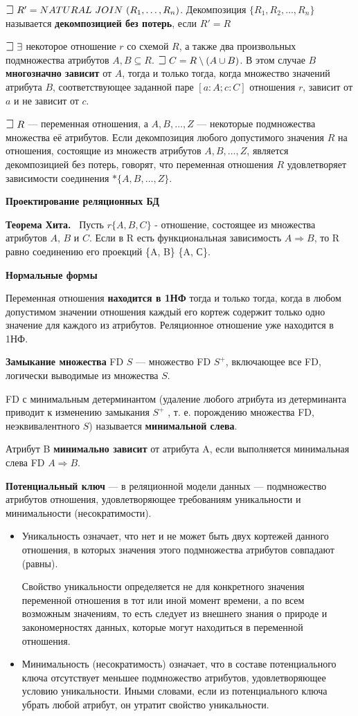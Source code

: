 $\mathLet ~ R' = NATURAL~JOIN~(R_1, \dots, R_n)$.
Декомпозиция $\{R_1, R_2, \dots , R_n\}$ называется \textbf{декомпозицией без потерь}, если $R' = R$

$\mathLet  ~ \exists$ некоторое отношение $r$ со схемой $R$, а также два произвольных подмножества атрибутов $A,B\subseteq R$.
$\mathLet ~ C = R \setminus (A\cup B)$.
В этом случае $B$ \textbf{многозначно зависит} от $A$, тогда и только тогда, когда множество значений атрибута $B$, соответствующее заданной паре $[a:A;c:C]$ отношения $r$, зависит от $a$ и не зависит от $c$.

$\mathLet ~ R$ --- переменная отношения, а $A, B, \dots, Z$ --- некоторые подмножества множества её атрибутов.
Если декомпозиция любого допустимого значения $R$ на отношения, состоящие из множеств атрибутов $A, B, \dots, Z$, является декомпозицией без потерь, говорят, что переменная отношения $R$ удовлетворяет зависимости соединения $\ast\{A, B, \dots, Z\}$.

\textbf{Проектирование реляционных БД}

\textbf{Теорема Хита.}
\mathLet \ Пусть $r \{A, B, C\}$ - отношение, состоящее из множества атрибутов $A$, $B$ и $C$. Если в R есть функциональная зависимость $A \Rightarrow B$, то R равно соединению его проекций \{A, B\} \{A, С\}.


\textbf{Нормальные формы}

Переменная отношения \textbf{находится в 1НФ} тогда и только тогда, когда в любом допустимом значении отношения каждый его кортеж содержит только одно значение для каждого из атрибутов.
Реляционное отношение уже находится в 1НФ.

\textbf{Замыкание множества} FD $S$ --- множество FD $S^+$, включающее все FD, логически выводимые из множества $S$.

FD с минимальным детерминантом (удаление любого атрибута из детерминанта приводит к изменению замыкания $S^+$ , т. е. порождению множества FD, неэквивалентного $S$) называется \textbf{минимальной слева}.

Атрибут B \textbf{минимально зависит} от атрибута A, если выполняется минимальная слева FD $A \Rightarrow B$.

\textbf{Потенциальный ключ} --- в реляционной модели данных --- подмножество атрибутов отношения, удовлетворяющее требованиям уникальности и минимальности (несократимости).
\begin{itemize}
    \item Уникальность означает, что нет и не может быть двух кортежей данного отношения, в которых значения этого подмножества атрибутов совпадают (равны).

    Свойство уникальности определяется не для конкретного значения переменной отношения в тот или иной момент времени, а по всем возможным значениям, то есть следует из внешнего знания о природе и закономерностях данных, которые могут находиться в переменной отношения.
    \item Минимальность (несократимость) означает, что в составе потенциального ключа отсутствует меньшее подмножество атрибутов, удовлетворяющее условию уникальности.
    Иными словами, если из потенциального ключа убрать любой атрибут, он утратит свойство уникальности.
\end{itemize}

